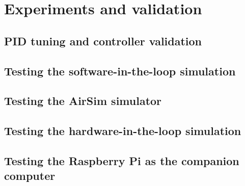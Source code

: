 \chapter{Experiments and validation}
\label{chap:validation}

\section{PID tuning and controller validation}


\section{Testing the software-in-the-loop simulation}


\section{Testing the AirSim simulator}


\section{Testing the hardware-in-the-loop simulation}


\section{Testing the Raspberry Pi as the companion computer}

